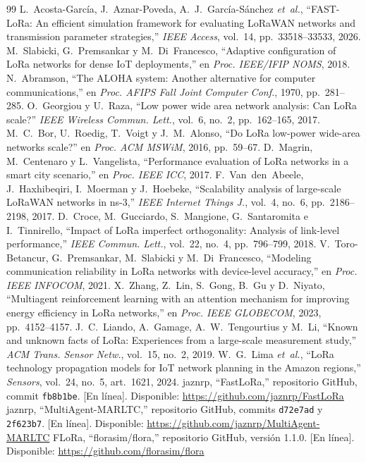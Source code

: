 \documentclass[conference,a4paper]{IEEEtran}
\begin{document}
\begin{thebibliography}{99}
 L.~Acosta-García, J.~Aznar-Poveda, A.~J.~García-Sánchez \emph{et~al.}, ``FAST-LoRa: An efficient simulation framework for evaluating LoRaWAN networks and transmission parameter strategies,'' \emph{IEEE Access}, vol.~14, pp.~33518--33533, 2026.
 M.~Slabicki, G.~Premsankar y M.~Di~Francesco, ``Adaptive configuration of LoRa networks for dense IoT deployments,'' en \emph{Proc. IEEE/IFIP NOMS}, 2018.
 N.~Abramson, ``The ALOHA system: Another alternative for computer communications,'' en \emph{Proc. AFIPS Fall Joint Computer Conf.}, 1970, pp.~281--285.
 O.~Georgiou y U.~Raza, ``Low power wide area network analysis: Can LoRa scale?'' \emph{IEEE Wireless Commun. Lett.}, vol.~6, no.~2, pp.~162--165, 2017.
 M.~C.~Bor, U.~Roedig, T.~Voigt y J.~M.~Alonso, ``Do LoRa low-power wide-area networks scale?'' en \emph{Proc. ACM MSWiM}, 2016, pp.~59--67.
 D.~Magrin, M.~Centenaro y L.~Vangelista, ``Performance evaluation of LoRa networks in a smart city scenario,'' en \emph{Proc. IEEE ICC}, 2017.
 F.~Van~den~Abeele, J.~Haxhibeqiri, I.~Moerman y J.~Hoebeke, ``Scalability analysis of large-scale LoRaWAN networks in ns-3,'' \emph{IEEE Internet Things J.}, vol.~4, no.~6, pp.~2186--2198, 2017.
 D.~Croce, M.~Gucciardo, S.~Mangione, G.~Santaromita e I.~Tinnirello, ``Impact of LoRa imperfect orthogonality: Analysis of link-level performance,'' \emph{IEEE Commun. Lett.}, vol.~22, no.~4, pp.~796--799, 2018.
 V.~Toro-Betancur, G.~Premsankar, M.~Slabicki y M.~Di~Francesco, ``Modeling communication reliability in LoRa networks with device-level accuracy,'' en \emph{Proc. IEEE INFOCOM}, 2021.
 X.~Zhang, Z.~Lin, S.~Gong, B.~Gu y D.~Niyato, ``Multiagent reinforcement learning with an attention mechanism for improving energy efficiency in LoRa networks,'' en \emph{Proc. IEEE GLOBECOM}, 2023, pp.~4152--4157.
 J.~C.~Liando, A.~Gamage, A.~W.~Tengourtius y M.~Li, ``Known and unknown facts of LoRa: Experiences from a large-scale measurement study,'' \emph{ACM Trans. Sensor Netw.}, vol.~15, no.~2, 2019.
 W.~G.~Lima \emph{et~al.}, ``LoRa technology propagation models for IoT network planning in the Amazon regions,'' \emph{Sensors}, vol.~24, no.~5, art.~1621, 2024.
 jaznrp, ``FastLoRa,'' repositorio GitHub, commit \texttt{fb8b1be}. [En línea]. Disponible: \url{https://github.com/jaznrp/FastLoRa}
 jaznrp, ``MultiAgent-MARLTC,'' repositorio GitHub, commits \texttt{d72e7ad} y \texttt{2f623b7}. [En línea]. Disponible: \url{https://github.com/jaznrp/MultiAgent-MARLTC}
 FLoRa, ``florasim/flora,'' repositorio GitHub, versión 1.1.0. [En línea]. Disponible: \url{https://github.com/florasim/flora}
\end{thebibliography}
\end{document}
